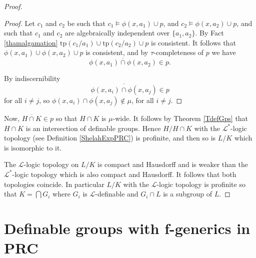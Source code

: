 \documentclass[12pt]{article}
\theoremstyle{definition}
\theoremstyle{mystyle}
\theoremstyle{remark}
\newenvironment{claimproof}
    {\begin{proof}}{\renewcommand\qedsymbol{\Squarepipe} \end{proof}}
\newcommand{\tp}{\mathrm{tp}}
\begin{document}
\begin{proof}
\begin{claimproof}
Let $c_1$ and $c_2$ be such that $c_1 \models \phi(x, a_1) \cup p$, and $c_2 \models \phi(x, a_2) \cup p$, and such that $c_1$ and $c_2$ are algebraically independent over $\{a_1, a_2\}$.
By Fact \ref{thamalgamation} $ \tp(c_1/a_1) \cup \tp(c_2/a_2) \cup p$ is consistent.
It follows that $\phi(x, a_1) \cup \phi(x, a_2) \cup p$ is consistent, and by $\tau$-completeness of $p$ we have
\[\overline{\phi(x, a_1) \cap \phi(x, a_2)} \in p.\]

By indiscernibility \[\overline{\phi(x, a_i) \cap \phi(x, a_j)} \in p\] for all $i \not = j$, so $\phi(x, a_i) \cap \phi(x, a_j) \not \in \mu$, for all $i \not = j$.
\end{claimproof}

Now, ${\overline{H \cap K}}\in p$ so that $H \cap K$ is
$\mu$-wide. It follows by Theorem \ref{TdefGps} that $H \cap K$ is
an intersection of definable groups. Hence $H/H\cap K$ with the
$\mathcal L^*$-logic topology (see Definition \ref{ShelahExpPRC})
is profinite, and then so is $L/K$ which is isomorphic to it.

The $\mathcal L$-logic topology on $L/K$ is compact and Hausdorff
and is weaker than the $\mathcal L^*$-logic topology which is also
compact and Hausdorff. It follows that both topologies coincide.
In particular $L/K$ with the $\mathcal L$-logic topology is
profinite so that $K=\bigcap G_i$ where $G_i$ is $\mathcal
L$-definable and $G_i\cap L$ is a subgroup of $L$.
\end{proof}








\section{Definable groups with f-generics in PRC}\label{STheorem}
\end{document}

